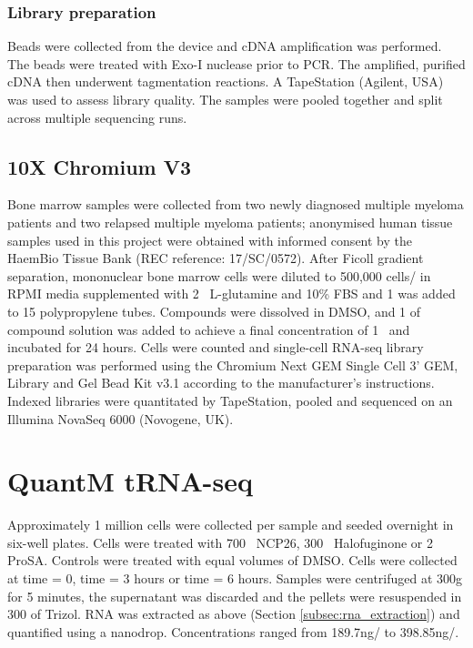 \subsubsection{Library preparation}
Beads were collected from the device and cDNA amplification was performed.
The beads were treated with Exo-I nuclease prior to PCR.
The amplified, purified cDNA then underwent tagmentation reactions.
A TapeStation (Agilent, USA) was used to assess library quality.
The samples were pooled together and split across multiple sequencing runs.

\subsection{10X Chromium V3}\label{subsec:10x_method}
Bone marrow samples were collected from two newly diagnosed multiple myeloma patients and two relapsed multiple myeloma patients;
anonymised human tissue samples used in this project were obtained with informed consent by the HaemBio Tissue Bank (REC reference: 17/SC/0572).
After Ficoll gradient separation, mononuclear bone marrow cells were diluted to 500,000 cells/\ml{} in RPMI media supplemented with 2\si{\milli\Molar}
L-glutamine and 10\% FBS and 1\ml{} was added to 15\ml{} polypropylene tubes.
Compounds were dissolved in DMSO, and 1\ul{} of compound solution was added to achieve a final concentration of 1\si{\micro\Molar} and incubated for 24 hours.
Cells were counted and single-cell RNA-seq library preparation was performed using the Chromium Next GEM Single Cell 3' GEM, Library and Gel Bead Kit v3.1 according to the manufacturer's instructions.
Indexed libraries were quantitated by TapeStation, pooled and sequenced on an Illumina NovaSeq 6000 (Novogene, UK).

\section{QuantM tRNA-seq}\label{sec:quantm}
Approximately 1 million cells were collected per sample and seeded overnight in six-well plates.
Cells were treated with 700\si{\nano\Molar} NCP26, 300\si{\nano\Molar} Halofuginone or 2\si{\micro\Molar} ProSA.
Controls were treated with equal volumes of DMSO.
Cells were collected at time = 0, time = 3 hours or time = 6 hours.
Samples were centrifuged at 300g for 5 minutes, the supernatant was discarded and the pellets were resuspended in 300\ul{} of Trizol.
RNA was extracted as above (Section \ref{subsec:rna_extraction}) and quantified using a nanodrop.
Concentrations ranged from  189.7\si{\ng}/\ul{} to 398.85\si{\ng}/\ul{}.

